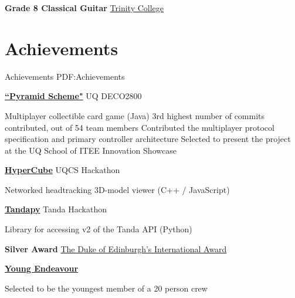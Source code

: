 \documentclass[a4paper,10pt,oneside]{article}
\begin{document}
\begin{body}



\textbf{Grade 8 Classical Guitar}
\href{http://www.trinitycollege.com/}{Trinity College}
\hfill {}






\section
{Achievements}
{Achievements}
{PDF:Achievements}


\href{https://github.com/UQdeco2800/deco2800-2016-pyramidscheme}{\textbf{``Pyramid Scheme"}} UQ DECO2800 \hfill {}
\begin{detail}
	\BulletItem Multiplayer collectible card game (Java)
	\BulletItem 3rd highest number of commits contributed, out of 54 team members
	\BulletItem Contributed the multiplayer protocol specification and primary controller architecture
	\BulletItem Selected to present the project at the UQ School of ITEE Innovation Showcase
\end{detail}

\EntryGap

\href{https://github.com/Chrischar/HyperCube}{\textbf{HyperCube}} UQCS Hackathon \hfill {}
\begin{detail}
Networked headtracking 3D-model viewer (C++ / JavaScript)
\end{detail}

\EntryGap

\href{https://github.com/Baralabite/Tandapy}{\textbf{Tandapy}} Tanda Hackathon \hfill {}
\begin{detail}
Library for accessing v2 of the Tanda API (Python)
\end{detail}

\EntryGap

\textbf{Silver Award}
\href{http://www.dukeofed.com.au/}{The Duke of Edinburgh’s International Award}
\hfill {}

\EntryGap

\href{https://www.youngendeavour.gov.au/}{\textbf{Young Endeavour}} \hfill {}
\begin{detail}
Selected to be the youngest member of a 20 person crew
\end{detail}


\end{body}
\end{document}
